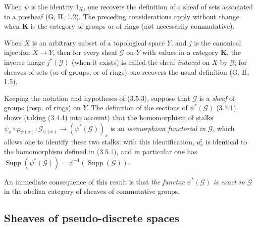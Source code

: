 \begin{env}[3.7.1]
When $\psi$ is the identity $1_X$, one recovers the definition of a sheaf
of sets associated to a presheaf (G, II, 1.2). The preceding
considerations apply without change when $\boldsymbol{K}$ is the
category of groups or of rings (not necessarily commutative).

When $X$ is an arbitrary subset of a topological space $Y$, and $j$ is
the canonical injection $X\to Y$, then for every sheaf $\mathcal{G}$ on $Y$ with
values in a category $\boldsymbol{K}$, the inverse image $j^*(\mathcal{G})$ (when it
exists) is called the sheaf \emph{induced} on $X$ by $\mathcal{G}$; for sheaves
of sets (or of groups, or of rings) one recovers the usual definition
(G, II, 1.5).
\end{env}

\begin{env}[3.7.2]
\label{0.3.7.2}
Keeping the notation and hypotheses of (3.5.3), suppose that
$\mathcal{G}$ is a \emph{sheaf} of groups (resp. of rings) on $Y$.
The definition of the sections of $\psi^*(\mathcal{G})$ (3.7.1) shows (taking
(3.4.4) into account) that the homomorphism of stalks
$\psi_x\circ\rho_{\psi(x)}:\mathcal{G}_{\psi(x)}\to
(\psi^*(\mathcal{G}))_x$ is an \emph{isomorphism functorial in
$\mathcal{G}$}, which allows one to identify these two stalks; with this
identification, $u_x^\sharp$ is identical to the homomorphism defined in
(3.5.1), and in particular one has
$\operatorname{Supp}(\psi^*(\mathcal{G}))=
\psi^{-1}(\operatorname{Supp}(\mathcal{G}))$.

An immediate consequence of this result is that \emph{the functor
$\psi^*(\mathcal{G})$ is exact in $\mathcal{G}$} in the abelian category
of sheaves of commutative groups.
\end{env}

\subsection{Sheaves of pseudo-discrete spaces}


